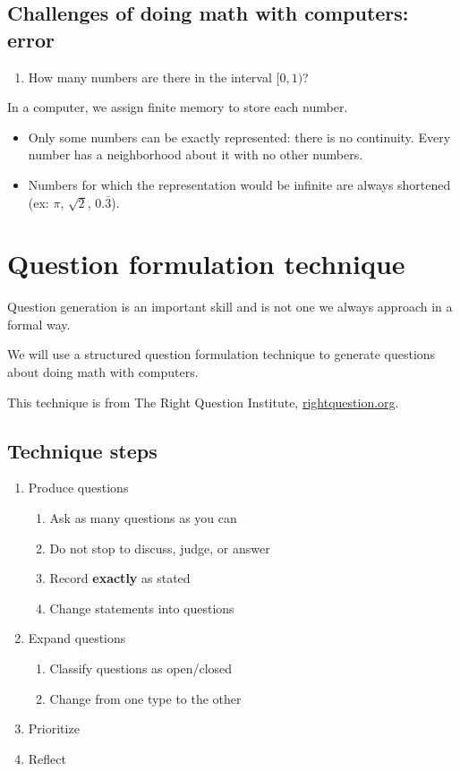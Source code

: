 \documentclass[12pt,letterpaper,noanswers]{exam}
\begin{document}
\subsection{Challenges of doing math with computers: error}
\begin{enumerate}[resume]
\item How many numbers are there in the interval $[0,1)$?  
\end{enumerate}
\vspace{0.2in}

\noindent In a computer, we assign finite memory to store each number.  
\begin{itemize}
\itemsep0pt
    \item Only some numbers can be exactly represented: there is no continuity.  Every number has a neighborhood about it with no other numbers.
    \item Numbers for which the representation would be infinite are always shortened (ex: $\pi$, $\sqrt{2}$, $0.\bar{3}$).
\end{itemize}

\vspace{1in}

\section{Question formulation technique}
Question generation is an important skill and is not one we always approach in a formal way.

We will use a structured question formulation technique to generate questions about doing math with computers.

This technique is from The Right Question Institute, \url{rightquestion.org}.

\subsection{Technique steps}
\begin{enumerate}
    \item Produce questions
    \begin{enumerate}
        \item Ask as many questions as you can
        \item Do not stop to discuss, judge, or answer
        \item Record \textbf{exactly} as stated
        \item Change statements into questions
    \end{enumerate}
    \item Expand questions
    \begin{enumerate}
    \item Classify questions as open/closed
    \item Change from one type to the other
    \end{enumerate}
    \item Prioritize
    \item Reflect
\end{enumerate}
\end{document}

